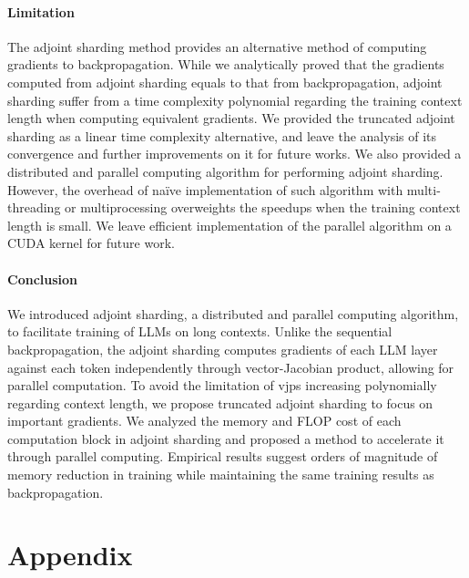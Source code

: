 \documentclass{article}
\newcommand{\vjp}{\mathrm{vjp}}
\newcommand{\xx}[1]{{\color{cyan} Xingzi: #1 }}
\begin{document}

\paragraph{Limitation}
The adjoint sharding method provides an alternative method of computing gradients to backpropagation. While we analytically proved that the gradients computed from adjoint sharding equals to that from backpropagation, adjoint sharding suffer from a time complexity polynomial regarding the training context length when computing equivalent gradients. We provided the truncated adjoint sharding as a linear time complexity alternative, and leave the analysis of its convergence and further improvements on it for future works. We also provided a distributed and parallel computing algorithm for performing adjoint sharding. However, the overhead of naïve implementation of such algorithm with multi-threading or multiprocessing overweights the speedups when the training context length is small. We leave efficient implementation of the parallel algorithm on a CUDA kernel for future work.

\paragraph{Conclusion}
We introduced adjoint sharding, a distributed and parallel computing algorithm, to facilitate training of LLMs on long contexts. Unlike the sequential backpropagation, the adjoint sharding computes gradients of each LLM layer against each token independently through vector-Jacobian product, allowing for parallel computation. To avoid the limitation of $\vjp$s increasing polynomially regarding context length, we propose truncated adjoint sharding to focus on important gradients. We analyzed the memory and FLOP cost of each computation block in adjoint sharding and proposed a method to accelerate it through parallel computing. Empirical results suggest orders of magnitude of memory reduction in training while maintaining the same training results as backpropagation. 

\clearpage

  

\appendix
\section{Appendix}
\end{document}
